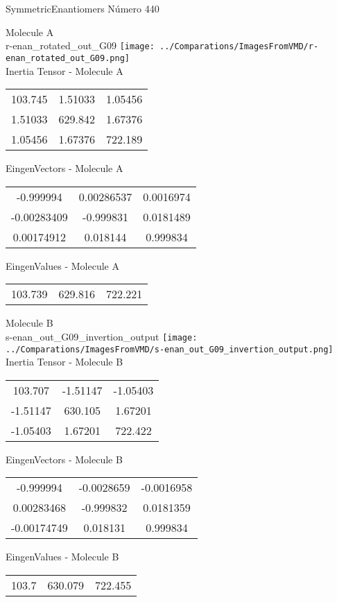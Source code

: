 \vtab[-2cm]
\begin{center}
{\large SymmetricEnantiomers \tab Número 440}
\end{center}
\begin{multicols}{2}
\begin{center}

Molecule A \\ 
r-enan\_rotated\_out\_G09
\texttt{[image: ../Comparations/ImagesFromVMD/r-enan\_rotated\_out\_G09.png]}
\\
Inertia Tensor - Molecule A \\
\vtab

\begin{tabular}{|c c c|}
103.745	 & 	1.51033	 & 	1.05456	 \\
1.51033	 & 	629.842	 & 	1.67376	 \\
1.05456	 & 	1.67376	 & 	722.189
\end{tabular}

\vtab
 EingenVectors - Molecule A     \\
\vtab
\begin{tabular}{|c c c|}
-0.999994	 & 	0.00286537	 & 	0.0016974	 \\
-0.00283409	 & 	-0.999831	 & 	0.0181489	 \\
0.00174912	 & 	0.018144	 & 	0.999834
\end{tabular}

\vtab
 EingenValues - Molecule A     \\
\vtab
\begin{tabular}{|c c c|}
103.739	 & 	629.816	 & 	722.221	 \\
\end{tabular}
\columnbreak

Molecule B \\ 
s-enan\_out\_G09\_invertion\_output
\texttt{[image: ../Comparations/ImagesFromVMD/s-enan\_out\_G09\_invertion\_output.png]}
\\
Inertia Tensor - Molecule B \\
\vtab

\begin{tabular}{|c c c|}
103.707	 & 	-1.51147	 & 	-1.05403	 \\
-1.51147	 & 	630.105	 & 	1.67201	 \\
-1.05403	 & 	1.67201	 & 	722.422
\end{tabular}

\vtab
 EingenVectors - Molecule B     \\
\vtab
\begin{tabular}{|c c c|}
-0.999994	 & 	-0.0028659	 & 	-0.0016958	 \\
0.00283468	 & 	-0.999832	 & 	0.0181359	 \\
-0.00174749	 & 	0.018131	 & 	0.999834
\end{tabular}

\vtab
 EingenValues - Molecule B     \\
\vtab
\begin{tabular}{|c c c|}
103.7	 & 	630.079	 & 	722.455	 \\
\end{tabular}

\end{center}
\end{multicols}
